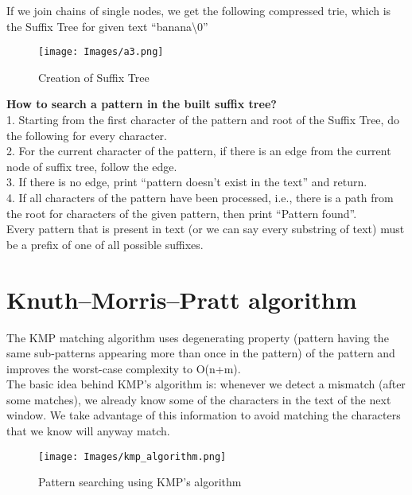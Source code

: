 \documentclass[11pt,a4paper]{article}
\begin{document}
If we join chains of single nodes, we get the following compressed trie, which is the Suffix Tree for given text “banana\textbackslash0” 
\vspace{0.4cm}
\begin{figure}[H]
    \centering
    \texttt{[image: Images/a3.png]}
    \caption{Creation of Suffix Tree}
    \label{fig:StoringExample}
\end{figure}
\textbf{How to search a pattern in the built suffix tree? }
\\
1. Starting from the first character of the pattern and root of the Suffix Tree, do the following for every character.
\\
2. For the current character of the pattern, if there is an edge from the current node of suffix tree, follow the edge.
\\
3. If there is no edge, print “pattern doesn’t exist in the text” and return.
\\
4. If all characters of the pattern have been processed, i.e., there is a path from the root for characters of the given pattern, then print “Pattern found”.
\\
Every pattern that is present in text (or we can say every substring of text) must be a prefix of one of all possible suffixes.

\section{Knuth–Morris–Pratt algorithm}
\label{sec:KMP algorithm}
The KMP matching algorithm uses degenerating property (pattern having the same sub-patterns appearing more than once in the pattern) of the pattern and improves the worst-case complexity to O(n+m).
\\
The basic idea behind KMP’s algorithm is: whenever we detect a mismatch (after some matches), we already know some of the characters in the text of the next window. We take advantage of this information to avoid matching the characters that we know will anyway match.
\\

\begin{figure}[H]
    \centering
    \texttt{[image: Images/kmp\_algorithm.png]}
    \caption{Pattern searching using KMP's algorithm}
    \label{fig:StoringExample}
\end{figure}
\end{document}
